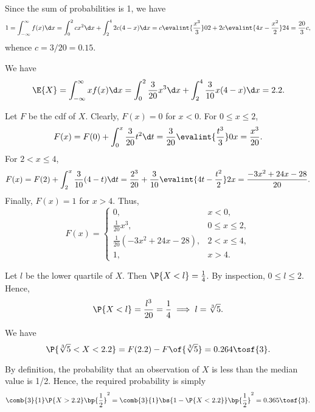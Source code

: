 \begin{solution}
    \begin{ppart}
        Since the sum of probabilities is 1, we have \[1 = \int_{-\infty}^\infty f(x) \d x = \int_0^2 cx^2 \d x + \int_2^4 2c(4-x) \d x = c\evalint{\frac{x^3}{3}}02 + 2c \evalint{4x - \frac{x^2}{2}}24 = \frac{20}3 c,\] whence $c = 3/20 = 0.15$.
    \end{ppart}
    \begin{ppart}
        We have \[\E{X} = \int_{-\infty}^\infty x f(x) \d x = \int_0^2 \frac3{20} x^3 \d x + \int_2^4 \frac{3}{10} x(4-x) \d x = 2.2.\]
    \end{ppart}
    \begin{ppart}
        Let $F$ be the cdf of $X$. Clearly, $F(x) = 0$ for $x < 0$. For $0 \leq x \leq 2$, \[F(x) = F(0) + \int_0^x \frac3{20} t^2 \d t = \frac3{20} \evalint{\frac{t^3}{3}}0x = \frac{x^3}{20}.\] For $2 < x \leq 4$, \[F(x) = F(2) + \int_2^x \frac3{10} (4-t) \d t = \frac{2^3}{20} + \frac3{10} \evalint{4t - \frac{t^2}2}2x = \frac{-3x^2 + 24x - 28}{20}.\] Finally, $F(x) = 1$ for $x > 4$. Thus, \[F(x) = \begin{cases}
            0, & x < 0,\\
            \frac{1}{20} x^3, & 0 \leq x \leq 2,\\
            \frac1{20} (-3x^2 + 24x - 28), & 2 < x \leq 4,\\
            1, & x > 4.
        \end{cases}\]

        Let $l$ be the lower quartile of $X$. Then $\P{X < l} = \frac14$. By inspection, $0 \leq l \leq 2$. Hence, \[\P{X < l} = \frac{l^3}{20} = \frac14 \implies l = \sqrt[3]{5}.\]
    \end{ppart}
    \begin{ppart}
        We have \[\P{\sqrt[3]{5} < X < 2.2} = F(2.2) - F\of{\sqrt[3]{5}} = 0.264 \tosf{3}.\]
    \end{ppart}
    \begin{ppart}
        By definition, the probability that an observation of $X$ is less than the median value is 1/2. Hence, the required probability is simply \[\comb{3}{1} \P{X > 2.2} \bp{\frac12}^2 = \comb{3}{1} \bs{1 - \P{X < 2.2}} \bp{\frac12}^2 = 0.365 \tosf{3}.\]
    \end{ppart}
\end{solution}

